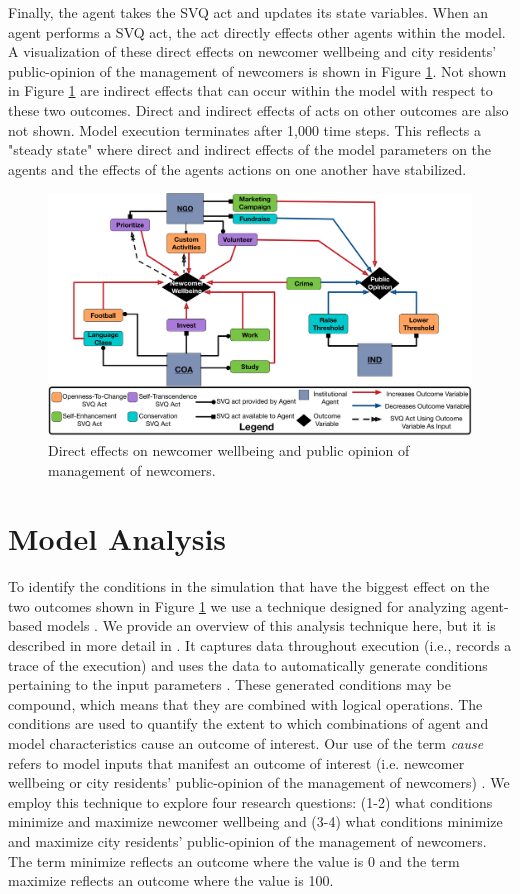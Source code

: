 \documentclass{scspaperproc}
\theoremstyle{scsthe}
\begin{document}
Finally, the agent takes the SVQ act and updates its state variables. When an agent performs a SVQ act, the act directly effects other agents within the model. A visualization of these direct effects on newcomer wellbeing and city residents' public-opinion of the management of newcomers is shown in Figure \ref{fig:model-dynamics}. Not shown in Figure \ref{fig:model-dynamics} are indirect effects that can occur within the model with respect to these two outcomes. Direct and indirect effects of acts on other outcomes are also not shown. Model execution terminates after 1,000 time steps. This reflects a "steady state" where direct and indirect effects of the model parameters on the agents and the effects of the agents actions on one another have stabilized.

\begin{figure}[htb]
{
\centering
\includegraphics[width=0.6125\columnwidth]{Newcomer-Wellbeing-Causal.png}
\caption{Direct effects on newcomer wellbeing and public opinion of management of newcomers.}
\label{fig:model-dynamics}
}
\end{figure}

\section{Model Analysis}
To identify the conditions in the simulation that have the biggest effect on the two outcomes shown in Figure \ref{fig:model-dynamics} we use a technique designed for analyzing agent-based models \cite{gore2017applying}. We provide an overview of this analysis technique here, but it is described in more detail in \cite{gore2015statistical}. It captures data throughout execution (i.e., records a trace of the execution) and uses the data to automatically generate conditions pertaining to the input parameters \cite{gore2017augmenting}. These generated conditions may be compound, which means that they are combined with logical operations. The conditions are used to quantify the extent to which combinations of agent and model characteristics cause an outcome of interest. Our use of the term \emph{cause} refers to model inputs that manifest an outcome of interest (i.e. newcomer wellbeing or city residents' public-opinion of the management of newcomers) \cite{cox1992causality}. We employ this technique to explore four research questions: (1-2) what conditions minimize and maximize newcomer wellbeing and (3-4) what conditions minimize and maximize city residents' public-opinion of the management of newcomers.  The term minimize reflects an outcome where the value is 0 and the term maximize reflects an outcome where the value is 100. 
\end{document}
